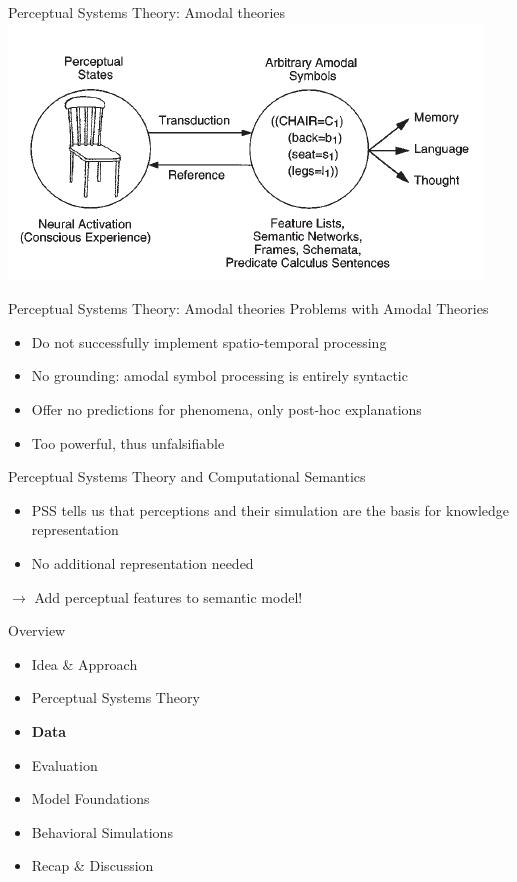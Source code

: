\documentclass[12pt,a4paper]{beamer}
\begin{document}
\begin{frame}{Perceptual Systems Theory: Amodal theories}
\includegraphics[scale=0.8]{barsalou_figure_2_amodal_symbol_systems.png}
\end{frame}

\begin{frame}{Perceptual Systems Theory: Amodal theories}
Problems with Amodal Theories
\begin{itemize}
\item Do not successfully implement spatio-temporal processing
\item No grounding: amodal symbol processing is entirely syntactic
\item Offer no predictions for phenomena, only post-hoc explanations
\item Too powerful, thus unfalsifiable
\end{itemize}
\end{frame}


\begin{frame}{Perceptual Systems Theory and Computational Semantics}
\begin{itemize}
\item PSS tells us that perceptions and their simulation are the basis for knowledge representation
\item No additional representation needed
\end{itemize}
$\to$ Add perceptual features to semantic model!
\end{frame}

\begin{frame}{Overview}
\begin{itemize}
\item Idea \& Approach
\item Perceptual Systems Theory
\item \textbf{Data}
\item Evaluation
    \item Model Foundations
    \item Behavioral Simulations
\item Recap \& Discussion
\end{itemize}
\end{frame}
\end{document}
